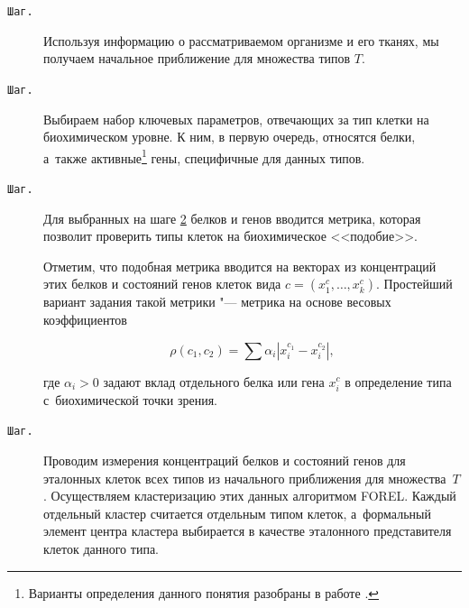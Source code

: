 \begin{description}





\item[\tt Шаг.\!\!]

 Используя информацию о рассматриваемом организме и его тканях, мы получаем начальное приближение для множества типов $T$.



\item[\tt Шаг.\!\!]\hypertarget{naz:st:1.2}{}

Выбираем набор ключевых параметров, отвечающих за тип клетки на биохимическом уровне. К ним, в первую очередь, относятся белки, а~также активные\footnote{Варианты определения данного понятия разобраны в работе \cite{Nazarov:bib:Nazarov2016}.}\!\! гены, специфичные для данных типов.



\item[\tt Шаг.\!\!] Для выбранных на шаге \hyperlink{naz:st:1.2}{2} белков и генов вводится метрика, которая позволит проверить типы клеток на биохимическое <<подобие>>.  

Отметим, что подобная метрика вводится на векторах из концентраций этих белков и состояний генов клеток вида $c = (x^{c}_{1}, \dots ,x^{c}_{k})$. Простейший вариант задания такой метрики "---  метрика на основе весовых коэффициентов 

$$ \rho(c_{1}, c_{2}) = \sum \alpha_{i} | x^{c_{1}}_{i} - x^{c_{2}}_{i}  | ,$$ 

где $\alpha_{i} >0 $ задают вклад отдельного белка или гена $x^{c}_{i}$ в определение типа с~биохимической точки зрения.

 

\item[\tt Шаг.\!\!] Проводим измерения концентраций белков и состояний генов для эталонных клеток всех типов из начального приближения для множества~$T$. Осуществляем кластеризацию этих данных алгоритмом FOREL. Каждый отдельный кластер считается отдельным типом клеток, а~формальный элемент центра кластера выбирается в качестве эталонного представителя клеток данного типа. 



\end{description}



\smallskip




